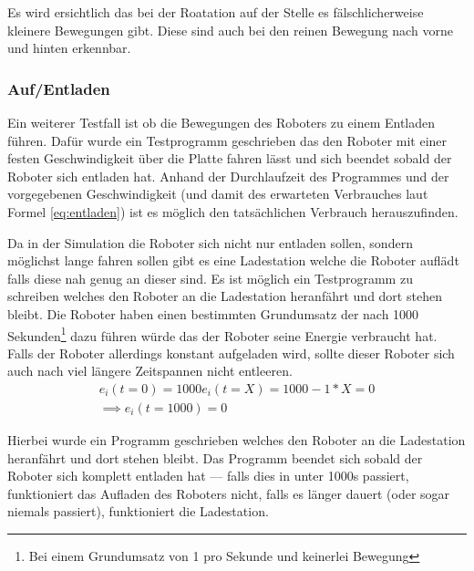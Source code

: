 {Es wird ersichtlich das bei der Roatation auf der Stelle es f{\"{a}}lschlicherweise kleinere Bewegungen gibt. Diese sind auch bei den reinen
Bewegung nach vorne und hinten erkennbar. 

\subsubsection{Auf/Entladen}
Ein weiterer Testfall ist ob die Bewegungen des Roboters zu einem Entladen f{\"{u}}hren. Daf{\"{u}}r wurde ein Testprogramm geschrieben
das den Roboter mit einer festen Geschwindigkeit {\"{u}}ber die Platte fahren l{\"{a}}sst und sich beendet sobald der Roboter sich
entladen hat. Anhand der Durchlaufzeit des Programmes und der vorgegebenen Geschwindigkeit (und damit des erwarteten Verbrauches
laut Formel \ref{eq:entladen}) ist es m{\"{o}}glich den tats{\"{a}}chlichen Verbrauch herauszufinden.


Da in der Simulation die Roboter sich nicht nur entladen sollen, sondern m{\"{o}}glichst lange fahren sollen gibt es eine
Ladestation welche die Roboter aufl{\"{a}}dt falls diese nah genug an dieser sind. Es ist m{\"{o}}glich ein Testprogramm zu
schreiben welches den Roboter an die Ladestation heranf{\"{a}}hrt und dort stehen bleibt. Die Roboter haben einen bestimmten
Grundumsatz der nach 1000 Sekunden\footnote{Bei einem Grundumsatz von 1 pro Sekunde und keinerlei Bewegung}
dazu f{\"{u}}hren w{\"{u}}rde das der Roboter seine Energie verbraucht hat. Falls der Roboter allerdings
konstant aufgeladen wird, sollte dieser Roboter sich auch nach viel l{\"{a}}ngere Zeitspannen nicht entleeren.
\begin{subequations}\label{eq:eval:laden}
\begin{align}
 e_i(t = 0) = 1000
	e_i(t = X) = 1000 - 1 * X  = 0 \\
	\implies e_i(t = 1000) = 0
\end{align}
\end{subequations}

Hierbei wurde ein Programm geschrieben welches den Roboter an die Ladestation heranf{\"{a}}hrt und dort stehen bleibt. Das Programm
beendet sich sobald der Roboter sich komplett entladen hat --- falls dies in unter 1000s passiert, funktioniert das Aufladen des
Roboters nicht, falls es l{\"{a}}nger dauert (oder sogar niemals passiert), funktioniert die Ladestation.

}
